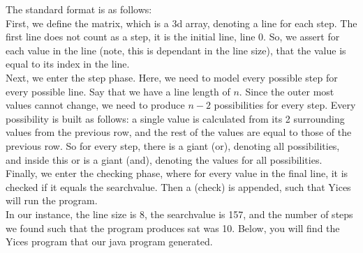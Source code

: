 \documentclass[12pt]{article}
\begin{document}
The standard format is as follows: \\
First, we define the matrix, which is a 3d array, denoting a line for each step.
The first line does not count as a step, it is the initial line, line 0.
So, we assert for each value in the line (note, this is dependant in the line size), that the value is equal to its index in the line. \\
Next, we enter the step phase.
Here, we need to model every possible step for every possible line.
Say that we have a line length of $n$.
Since the outer most values cannot change, we need to produce $n - 2$ possibilities for every step.
Every possibility is built as follows: a single value is calculated from its 2 surrounding values from the previous row, and the rest of the values are equal to those of the previous row.
So for every step, there is a giant (or), denoting all possibilities, and inside this or is a giant (and), denoting the values for all possibilities. \\
Finally, we enter the checking phase, where for every value in the final line, it is checked if it equals the searchvalue. Then a (check) is appended, such that Yices will run the program.\\

In our instance, the line size is 8, the searchvalue is 157, and the number of steps we found such that the program produces sat was 10.
Below, you will find the Yices program that our java program generated.
\end{document}
